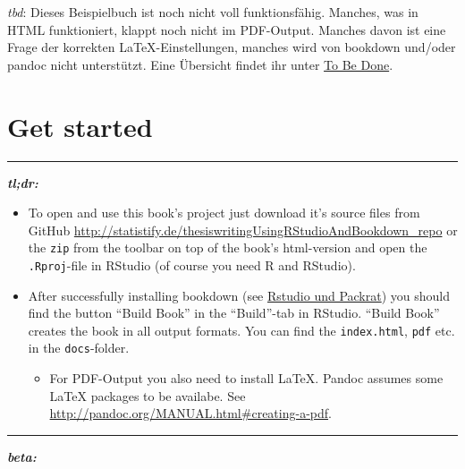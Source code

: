 \documentclass[]{book}
\providecommand{\tightlist}{%
  \setlength{\itemsep}{0pt}\setlength{\parskip}{0pt}}
\theoremstyle{definition}
\theoremstyle{definition}
\theoremstyle{remark}
\let\BeginKnitrBlock\begin \let\EndKnitrBlock\end
\begin{document}
\BeginKnitrBlock{rmdcaution}
\emph{tbd}: Dieses Beispielbuch ist noch nicht voll funktionsfähig.
Manches, was in HTML funktioniert, klappt noch nicht im PDF-Output.
Manches davon ist eine Frage der korrekten LaTeX-Einstellungen, manches
wird von bookdown und/oder pandoc nicht unterstützt. Eine Übersicht
findet ihr unter \protect\hyperlink{tbd}{To Be Done}.
\EndKnitrBlock{rmdcaution}

\section*{Get started}\label{get-started}

\begin{center}\rule{0.5\linewidth}{\linethickness}\end{center}

\textbf{\emph{tl;dr:}}

\begin{itemize}
\item
  To open and use this book's project just download it's source files
  from GitHub
  \url{http://statistify.de/thesiswritingUsingRStudioAndBookdown_repo}
  or the \texttt{zip} from the toolbar on top of the book's html-version
  and open the \texttt{.Rproj}-file in RStudio (of course you need R and
  RStudio).
\item
  After successfully installing bookdown (see
  \protect\hyperlink{rstudio-und-packrat}{Rstudio und Packrat}) you
  should find the button ``Build Book'' in the ``Build''-tab in RStudio.
  ``Build Book'' creates the book in all output formats. You can find
  the \texttt{index.html}, \texttt{pdf} etc. in the
  \texttt{docs}-folder.

  \begin{itemize}
  \tightlist
  \item
    For PDF-Output you also need to install LaTeX. Pandoc assumes some
    LaTeX packages to be availabe. See
    \url{http://pandoc.org/MANUAL.html\#creating-a-pdf}.
  \end{itemize}
\end{itemize}

\begin{center}\rule{0.5\linewidth}{\linethickness}\end{center}

\textbf{\emph{beta:}}
\end{document}
